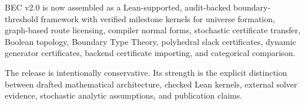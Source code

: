 \documentclass[
  11pt,
]{article}
\begin{document}
BEC v2.0 is now assembled as a Lean-supported, audit-backed
boundary-threshold framework with verified milestone kernels for
universe formation, graph-based route licensing, compiler normal forms,
stochastic certificate transfer, Boolean topology, Boundary Type Theory,
polyhedral slack certificates, dynamic generator certificates, backend
certificate importing, and categorical comparison.

The release is intentionally conservative. Its strength is the explicit
distinction between drafted mathematical architecture, checked Lean
kernels, external solver evidence, stochastic analytic assumptions, and
publication claims.
\end{document}
